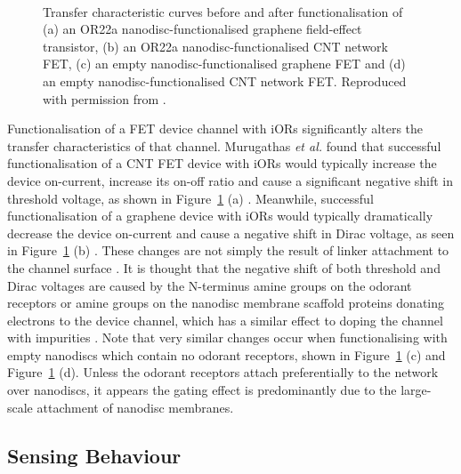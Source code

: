 \documentclass[
  a4paper,
]{scrbook}
\begin{document}
\begin{figure}
\begin{minipage}[t]{0.01\linewidth}
{\centering 

~

}

\end{minipage}%

\caption[Transfer characteristic curves of graphene and carbon nanotube
network field-effect transistors before and after OR22a
functionalisation.]{\label{fig-functionalisation-literature}Transfer
characteristic curves before and after functionalisation of (a) an OR22a
nanodisc-functionalised graphene field-effect transistor, (b) an OR22a
nanodisc-functionalised CNT network FET, (c) an empty
nanodisc-functionalised graphene FET and (d) an empty
nanodisc-functionalised CNT network FET. Reproduced with permission from
\autocite{Murugathas2019a,Murugathas2020}.}

\end{figure}

Functionalisation of a FET device channel with iORs significantly alters
the transfer characteristics of that channel. Murugathas \emph{et al.}
found that successful functionalisation of a CNT FET device with iORs
would typically increase the device on-current, increase its on-off
ratio and cause a significant negative shift in threshold voltage, as
shown in Figure~\ref{fig-functionalisation-literature} (a)
\autocite{Murugathas2019a}. Meanwhile, successful functionalisation of a
graphene device with iORs would typically dramatically decrease the
device on-current and cause a negative shift in Dirac voltage, as seen
in Figure~\ref{fig-functionalisation-literature} (b)
\autocite{Murugathas2020}. These changes are not simply the result of
linker attachment to the channel surface \autocite{Murugathas2019a}. It
is thought that the negative shift of both threshold and Dirac voltages
are caused by the N-terminus amine groups on the odorant receptors or
amine groups on the nanodisc membrane scaffold proteins donating
electrons to the device channel, which has a similar effect to doping
the channel with impurities
\autocite{Bradley2004,Murugathas2019a,Murugathas2020}. Note that very
similar changes occur when functionalising with empty nanodiscs which
contain no odorant receptors, shown in
Figure~\ref{fig-functionalisation-literature} (c) and
Figure~\ref{fig-functionalisation-literature} (d). Unless the odorant
receptors attach preferentially to the network over nanodiscs, it
appears the gating effect is predominantly due to the large-scale
attachment of nanodisc membranes.

\hypertarget{sensing-behaviour-1}{%
\subsection{Sensing Behaviour}\label{sensing-behaviour-1}}
\end{document}
